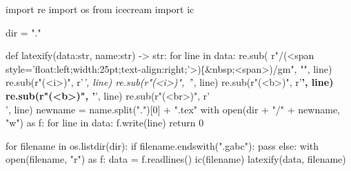 import re
import os
from icecream import ic

dir = "."

def latexify(data:str, name:str) -> str:
	for line in data:
		re.sub(
			r"/(<span style='float:left;width:25pt;text-align:right;'>)\d(\.&nbsp;<\/span>)/gm",
			"", line)
		re.sub(r"(<i>)", r'\textit{', line)
		re.sub(r"(<\/i>)", '}', line)
		re.sub(r"(<b>)", r'\textbf{', line)
		re.sub(r"(<\/b>)", '}', line)
		re.sub(r"(<\/br>)", r'\\', line)
	newname = name.split(".")[0] + ".tex"
	with open(dir + "/" + newname, "w") as f:
		for line in data:
			f.write(line)
	return 0

for filename in os.listdir(dir):
	if filename.endswith(".gabc"):
		pass
	else:
		with open(filename, "r") as f:
			data = f.readlines()
			ic(filename)
			latexify(data, filename)
